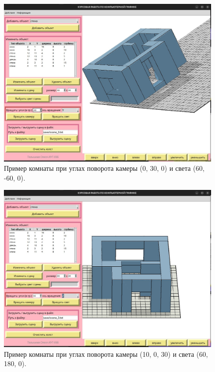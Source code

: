 \begin{figure}[H]
    \centering
    \includegraphics[width=1\textwidth]{img/example_light_0_30_0_camera_60_-60_0.png}
    \caption{Пример комнаты при углах поворота камеры (0, 30, 0) и света (60, -60, 0).}
    \label{fig:example_flat_1_2}
\end{figure}

\begin{figure}[H]
    \centering
    \includegraphics[width=1\textwidth]{img/example_light_10_0_30_camera_60_180_0.png}
    \caption{Пример комнаты при углах поворота камеры (10, 0, 30) и света (60, 180, 0).}
    \label{fig:example_flat_1_3}
\end{figure}


